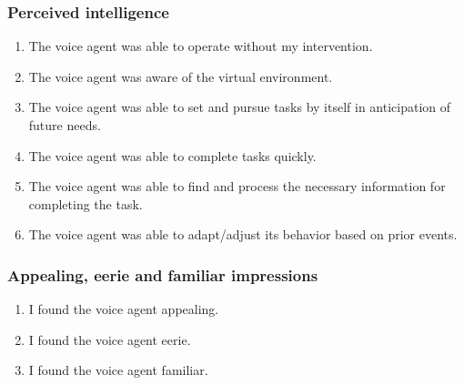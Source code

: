 \subsubsection*{Perceived intelligence}
\begin{enumerate}
\item[Q13.] \begin{minipage}[t]{\linewidth}
The voice agent was able to operate without my intervention.
\end{minipage}
\item[Q14.] \begin{minipage}[t]{\linewidth}
The voice agent was aware of the virtual environment.
\end{minipage}
\item[Q15.] \begin{minipage}[t]{\linewidth}
The voice agent was able to set and pursue tasks by itself in anticipation of future needs.
\end{minipage}
\item[Q16.] \begin{minipage}[t]{\linewidth}
The voice agent was able to complete tasks quickly.
\end{minipage}
\item[Q17.] \begin{minipage}[t]{\linewidth}
The voice agent was able to find and process the necessary information for completing the task.
\end{minipage}
\item[Q18.] \begin{minipage}[t]{\linewidth}
The voice agent was able to adapt/adjust its behavior based on prior events.
\end{minipage}
\end{enumerate}
\subsubsection*{Appealing, eerie and familiar impressions}
\begin{enumerate}
\item[Q20.] \begin{minipage}[t]{\linewidth}
I found the voice agent appealing.
\end{minipage}
\item[Q21.] \begin{minipage}[t]{\linewidth}
I found the voice agent eerie.
\end{minipage}
\item[Q22.] \begin{minipage}[t]{\linewidth}
I found the voice agent familiar.
\end{minipage}
\end{enumerate}
